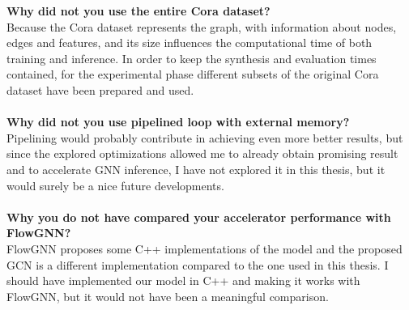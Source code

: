 \documentclass{article}
\begin{document}
\noindent
\textbf{Why did not you use the entire Cora dataset?} \\
\noindent
Because the Cora dataset represents the graph, with information about nodes, edges and features, and its size influences the computational time of both training and inference.
In order to keep the synthesis and evaluation times contained, for the experimental phase different subsets of the original Cora dataset have been prepared and used.
\\
\\
\noindent
\textbf{Why did not you use pipelined loop with external memory?} \\
\noindent
Pipelining would probably contribute in achieving even more better results, but since the explored optimizations allowed me to already obtain promising result and to accelerate GNN inference, I have not explored it in this thesis, but it would surely be a nice future developments.
\\
\\
\noindent
\textbf{Why you do not have compared your accelerator performance with FlowGNN?} \\
\noindent
FlowGNN proposes some C++ implementations of the model and the proposed GCN is a different implementation compared to the one used in this thesis. I should have implemented our model in C++ and making it works with FlowGNN, but it would not have been a meaningful comparison.
\\
\\
\noindent
\end{document}
